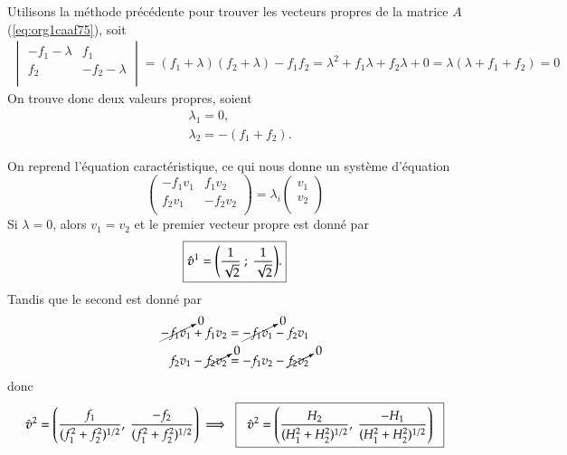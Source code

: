 \documentclass[10pt]{article}
\numberwithin{equation}{section}
\newcommand{\vv}{\vb*{v}}
\begin{document}
Utilisons la méthode précédente pour trouver les vecteurs propres de la matrice \(A\) (\ref{eq:org1caaf75}), soit
\begin{align}
   \begin{vmatrix}
     -f_1 - \lambda & f_1 \\
     f_2 & -f_2 - \lambda \\
   \end{vmatrix} = (f_1+\lambda)(f_2+\lambda) - f_1 f_2 = \lambda^2 + f_1 \lambda + f_2 \lambda + 0 =\boxed{ \lambda(\lambda + f_1 + f_2) = 0 }
\end{align}
On trouve donc deux valeurs propres, soient
\begin{subequations}
\begin{align}
   & \lambda_1 = 0, \\
   & \lambda_2 = - (f_1+f_2).
\end{align}
\end{subequations}

On reprend l'équation caractéristique, ce qui nous donne un système d'équation
\begin{equation}
   \begin{pmatrix}
     - f_1 v_1 & f_1 v_2 \\
     f_2 v_1 & -f_2 v_2 \\
   \end{pmatrix} = \lambda_i
   \begin{pmatrix}
     v_1\\
     v_2\\
   \end{pmatrix}
\end{equation}
Si \(\lambda = 0\), alors \(v_1 = v_2\) et le premier vecteur propre est donné par
\begin{equation}
   \boxed{\hat{\vv}^1 = \qty( \frac{1}{\sqrt{2}}\ ;\ \frac{1}{\sqrt{2}}).}
\end{equation}
Tandis que le second est donné par
\begin{align}
   \cancelto{0}{-f_1 v_1} + f_1 v_2 & = \cancelto{0}{-f_1 v_1} - f_2 v_1 \\
   f_2 v_1 - \cancelto{0}{f_2 v_2} & = -f_1 v_2 - \cancelto{0}{f_2 v_2} \\
\end{align}
donc
\begin{equation}
   \hat{\vv}^2 = \qty( \frac{f_1}{(f_1^2+f_2^2)^{1/2}},\ \frac{-f_2}{(f_1^2+f_2^2)^{1/2}})\ \Longrightarrow \hspace{0.2cm}\boxed{\hspace{0.2cm}\hat{\vv}^2=\qty( \frac{H_2}{(H_1^2+H_2^2)^{1/2}},\ \frac{-H_1}{(H_1^2+H_2^2)^{1/2}})\hspace{0.2cm}}
\end{equation}
\end{document}
